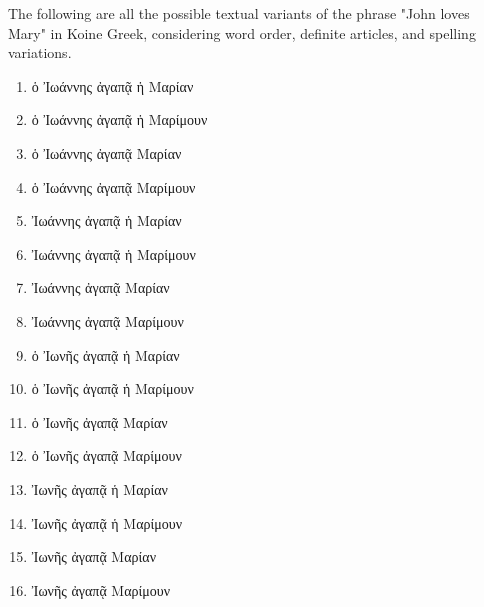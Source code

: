 \documentclass{article}
\begin{document}
The following are all the possible textual variants of the phrase "John loves Mary" in Koine Greek, considering word order, definite articles, and spelling variations.

\begin{enumerate}
\setlength{\itemsep}{3pt}

\item \textgreek{ὁ Ἰωάννης ἀγαπᾷ ἡ Μαρίαν}
\item \textgreek{ὁ Ἰωάννης ἀγαπᾷ ἡ Μαρίμουν}
\item \textgreek{ὁ Ἰωάννης ἀγαπᾷ Μαρίαν}
\item \textgreek{ὁ Ἰωάννης ἀγαπᾷ Μαρίμουν}
\item \textgreek{Ἰωάννης ἀγαπᾷ ἡ Μαρίαν}
\item \textgreek{Ἰωάννης ἀγαπᾷ ἡ Μαρίμουν}
\item \textgreek{Ἰωάννης ἀγαπᾷ Μαρίαν}
\item \textgreek{Ἰωάννης ἀγαπᾷ Μαρίμουν}
\item \textgreek{ὁ Ἰωνῆς ἀγαπᾷ ἡ Μαρίαν}
\item \textgreek{ὁ Ἰωνῆς ἀγαπᾷ ἡ Μαρίμουν}
\item \textgreek{ὁ Ἰωνῆς ἀγαπᾷ Μαρίαν}
\item \textgreek{ὁ Ἰωνῆς ἀγαπᾷ Μαρίμουν}
\item \textgreek{Ἰωνῆς ἀγαπᾷ ἡ Μαρίαν}
\item \textgreek{Ἰωνῆς ἀγαπᾷ ἡ Μαρίμουν}
\item \textgreek{Ἰωνῆς ἀγαπᾷ Μαρίαν}
\item \textgreek{Ἰωνῆς ἀγαπᾷ Μαρίμουν}


\end{enumerate}
\end{document}
